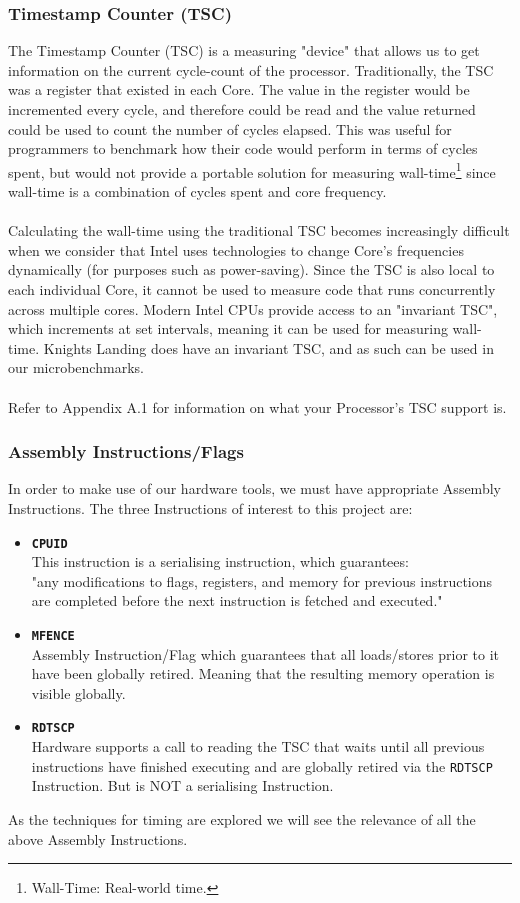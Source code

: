 \documentclass[bsc,frontabs,twoside,singlespacing,parskip,deptreport]{infthesis}     %
\begin{document}
\subsubsection{Timestamp Counter (TSC)}
The Timestamp Counter (TSC) is a measuring "device" that allows us to get information on the current cycle-count of the processor. Traditionally, the TSC was a register that existed in each Core. The value in the register would be incremented every cycle, and therefore could be read and the value returned could be used to count the number of cycles elapsed. This was useful for programmers to benchmark how their code would perform in terms of cycles spent, but would not provide a portable solution for measuring wall-time\footnote{Wall-Time: Real-world time.} since wall-time is a combination of cycles spent and core frequency. \\
\\
Calculating the wall-time using the traditional TSC becomes increasingly difficult when we consider that Intel uses technologies to change Core's frequencies dynamically (for purposes such as power-saving). Since the TSC is also local to each individual Core, it cannot be used to measure code that runs concurrently across multiple cores. Modern Intel CPUs provide access to an "invariant TSC", which increments at set intervals, meaning it can be used for measuring wall-time. Knights Landing does have an invariant TSC, and as such can be used in our microbenchmarks. \\
\\
Refer to Appendix A.1 for information on what your Processor's TSC support is.

\subsubsection{Assembly Instructions/Flags}
In order to make use of our hardware tools, we must have appropriate Assembly Instructions. The three Instructions of interest to this project are:
\begin{itemize}
    \item{
        {\bf \texttt{CPUID}\cite{cpuid_spec}} \\
        This instruction is a serialising instruction, which guarantees: \\
        "any modifications to flags, registers, and memory for previous instructions are completed before the next instruction is fetched and executed."
    }
    \item{
        {\bf \texttt{MFENCE}\cite{mfence_spec}} \\
        Assembly Instruction/Flag which guarantees that all loads/stores prior to it have been globally retired. Meaning that the resulting memory operation is visible globally.
    }
    \item{{\bf \texttt{RDTSCP}\cite{rdtscp_spec}} \\
    Hardware supports a call to reading the TSC that waits until all previous instructions have finished executing and are globally retired via the \texttt{RDTSCP} Instruction. But is NOT a serialising Instruction.}
\end{itemize}
As the techniques for timing are explored we will see the relevance of all the above Assembly Instructions.
\end{document}
